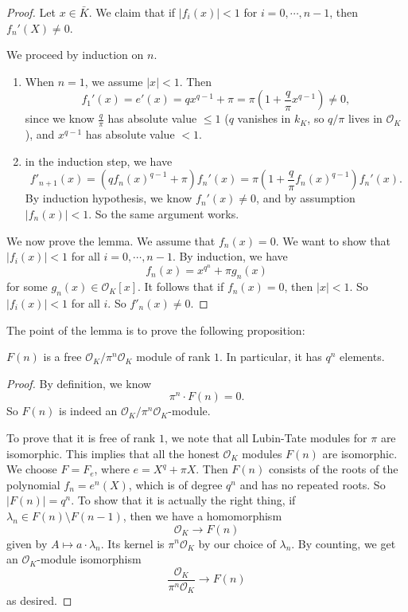 \documentclass[a4paper]{article}
\begin{document}
\begin{proof}
  Let $x \in \bar{K}$. We claim that if $|f_i(x)| < 1$ for $i = 0, \cdots, n - 1$, then $f_n'(X) \not= 0$.

  We proceed by induction on $n$.
  \begin{enumerate}
    \item When $n = 1$, we assume $|x| < 1$. Then
      \[
        f_1'(x) = e'(x) = q x^{q - 1} + \pi = \pi\left(1 + \frac{q}{\pi} x^{q - 1}\right) \not= 0,
      \]
      since we know $\frac{q}{\pi}$ has absolute value $\leq 1$ ($q$ vanishes in $k_K$, so $q/\pi$ lives in $\mathcal{O}_K$), and $x^{q - 1}$ has absolute value $< 1$.
    \item in the induction step, we have
      \[
        f'_{n + 1}(x) = (q f_n(x)^{q - 1} + \pi) f_n'(x) = \pi\left(1 + \frac{q}{\pi}f_n(x) ^{q - 1}\right) f_n'(x).
      \]
      By induction hypothesis, we know $f_n'(x) \not= 0$, and by assumption $|f_n(x)| < 1$. So the same argument works.
  \end{enumerate}
  We now prove the lemma. We assume that $f_n(x) = 0$. We want to show that $|f_i(x)| < 1$ for all $i = 0, \cdots, n - 1$. By induction, we have
  \[
    f_n(x) = x^{q^n} + \pi g_n(x)
  \]
  for some $g_n(x) \in \mathcal{O}_K[x]$. It follows that if $f_n(x) = 0$, then $|x| < 1$. So $|f_i(x)| < 1$ for all $i$. So $f'_n(x) \not= 0$.
\end{proof}

The point of the lemma is to prove the following proposition:
\begin{prop}
  $F(n)$ is a free $\mathcal{O}_K/\pi^n \mathcal{O}_K$ module of rank $1$. In particular, it has $q^n$ elements.
\end{prop}

\begin{proof}
  By definition, we know
  \[
    \pi^n \cdot F(n) = 0.
  \]
  So $F(n)$ is indeed an $\mathcal{O}_K/\pi^n \mathcal{O}_K$-module.

  To prove that it is free of rank $1$, we note that all Lubin-Tate modules for $\pi$ are isomorphic. This implies that all the honest $\mathcal{O}_K$ modules $F(n)$ are isomorphic. We choose $F = F_e$, where $e = X^q + \pi X$. Then $F(n)$ consists of the roots of the polynomial $f_n = e^n(X)$, which is of degree $q^n$ and has no repeated roots. So $|F(n)| = q^n$. To show that it is actually the right thing, if $\lambda_n \in F(n) \setminus F(n - 1)$, then we have a homomorphism
  \[
    \mathcal{O}_K \to F(n)
  \]
  given by $A \mapsto a \cdot \lambda_n$. Its kernel is $\pi^n \mathcal{O}_K$ by our choice of $\lambda_n$. By counting, we get an $\mathcal{O}_K$-module isomorphism
  \[
    \frac{\mathcal{O}_K}{\pi^n \mathcal{O}_K} \to F(n)
  \]
  as desired.
\end{proof}
\end{document}
